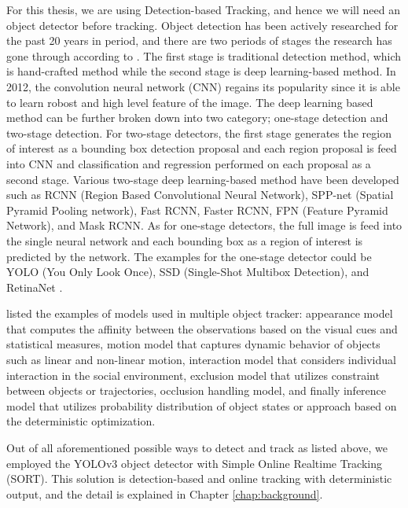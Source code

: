 For this thesis, we are using Detection-based Tracking, and hence we will need an object detector before tracking. Object detection has been actively researched for the past 20 years in period, and there are two periods of stages the research has gone through according to \citeauthor{zou_object_2019} \cite{zou_object_2019}. The first stage is traditional detection method, which is hand-crafted method while the second stage is deep learning-based method. In 2012, the convolution neural network (CNN) regains its popularity since it is able to learn robost and high level feature of the image. The deep learning based method can be further broken down into two category; one-stage detection and two-stage detection. For two-stage detectors, the first stage generates the region of interest as a bounding box detection proposal and each region proposal is feed into CNN and classification and regression performed on each proposal as a second stage. Various two-stage deep learning-based method have been developed such as RCNN (Region Based Convolutional Neural Network), SPP-net (Spatial Pyramid Pooling network), Fast RCNN, Faster RCNN, FPN (Feature Pyramid Network), and Mask RCNN. As for one-stage detectors, the full image is feed into the single neural network and each bounding box as a region of interest is predicted by the network. The examples for the one-stage detector could be YOLO (You Only Look Once), SSD (Single-Shot Multibox Detection), and RetinaNet \cite{zou_object_2019} \cite{sultana_review_2020}.

\citeauthor{luo_multiple_2021} listed the examples of models used in multiple object tracker: appearance model that computes the affinity between the observations based on the visual cues and statistical measures, motion model that captures dynamic behavior of objects such as linear and non-linear motion, interaction model that considers individual interaction in the social environment, exclusion model that utilizes constraint between objects or trajectories, occlusion handling model, and finally inference model that utilizes probability distribution of object states or approach based on the deterministic optimization.

Out of all aforementioned possible ways to detect and track as listed above, we employed the YOLOv3 object detector with Simple Online Realtime Tracking (SORT). This solution is detection-based and online tracking with deterministic output, and the detail is explained in Chapter \ref{chap:background}.

